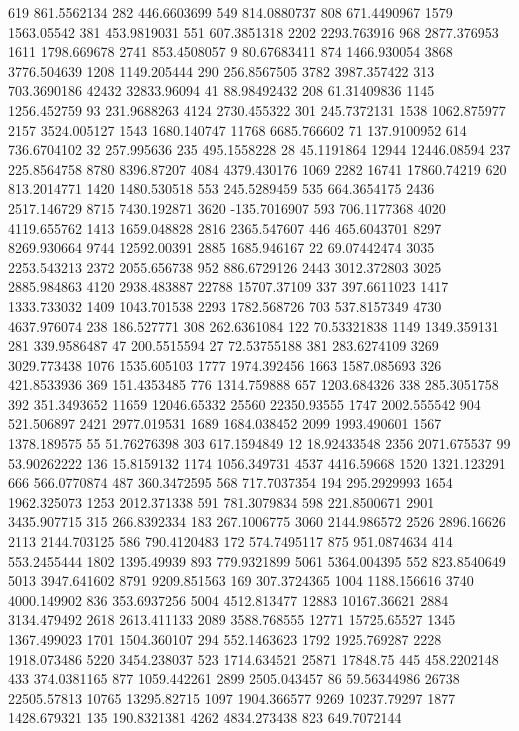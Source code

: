 619	861.5562134
282	446.6603699
549	814.0880737
808	671.4490967
1579	1563.05542
381	453.9819031
551	607.3851318
2202	2293.763916
968	2877.376953
1611	1798.669678
2741	853.4508057
9	80.67683411
874	1466.930054
3868	3776.504639
1208	1149.205444
290	256.8567505
3782	3987.357422
313	703.3690186
42432	32833.96094
41	88.98492432
208	61.31409836
1145	1256.452759
93	231.9688263
4124	2730.455322
301	245.7372131
1538	1062.875977
2157	3524.005127
1543	1680.140747
11768	6685.766602
71	137.9100952
614	736.6704102
32	257.995636
235	495.1558228
28	45.1191864
12944	12446.08594
237	225.8564758
8780	8396.87207
4084	4379.430176
1069	2282
16741	17860.74219
620	813.2014771
1420	1480.530518
553	245.5289459
535	664.3654175
2436	2517.146729
8715	7430.192871
3620	-135.7016907
593	706.1177368
4020	4119.655762
1413	1659.048828
2816	2365.547607
446	465.6043701
8297	8269.930664
9744	12592.00391
2885	1685.946167
22	69.07442474
3035	2253.543213
2372	2055.656738
952	886.6729126
2443	3012.372803
3025	2885.984863
4120	2938.483887
22788	15707.37109
337	397.6611023
1417	1333.733032
1409	1043.701538
2293	1782.568726
703	537.8157349
4730	4637.976074
238	186.527771
308	262.6361084
122	70.53321838
1149	1349.359131
281	339.9586487
47	200.5515594
27	72.53755188
381	283.6274109
3269	3029.773438
1076	1535.605103
1777	1974.392456
1663	1587.085693
326	421.8533936
369	151.4353485
776	1314.759888
657	1203.684326
338	285.3051758
392	351.3493652
11659	12046.65332
25560	22350.93555
1747	2002.555542
904	521.506897
2421	2977.019531
1689	1684.038452
2099	1993.490601
1567	1378.189575
55	51.76276398
303	617.1594849
12	18.92433548
2356	2071.675537
99	53.90262222
136	15.8159132
1174	1056.349731
4537	4416.59668
1520	1321.123291
666	566.0770874
487	360.3472595
568	717.7037354
194	295.2929993
1654	1962.325073
1253	2012.371338
591	781.3079834
598	221.8500671
2901	3435.907715
315	266.8392334
183	267.1006775
3060	2144.986572
2526	2896.16626
2113	2144.703125
586	790.4120483
172	574.7495117
875	951.0874634
414	553.2455444
1802	1395.49939
893	779.9321899
5061	5364.004395
552	823.8540649
5013	3947.641602
8791	9209.851563
169	307.3724365
1004	1188.156616
3740	4000.149902
836	353.6937256
5004	4512.813477
12883	10167.36621
2884	3134.479492
2618	2613.411133
2089	3588.768555
12771	15725.65527
1345	1367.499023
1701	1504.360107
294	552.1463623
1792	1925.769287
2228	1918.073486
5220	3454.238037
523	1714.634521
25871	17848.75
445	458.2202148
433	374.0381165
877	1059.442261
2899	2505.043457
86	59.56344986
26738	22505.57813
10765	13295.82715
1097	1904.366577
9269	10237.79297
1877	1428.679321
135	190.8321381
4262	4834.273438
823	649.7072144
